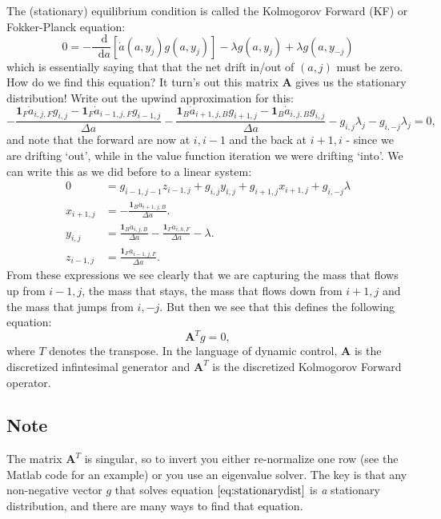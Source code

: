 \documentclass[12pt]{article}
\DeclareMathOperator{\1}{\mathbbm{1}}
\newcommand*\diff{\mathop{}\!\mathrm{d}}
\begin{document}
The (stationary) equilibrium condition is called the Kolmogorov Forward (KF) or Fokker-Planck equation:
\begin{equation}\label{eq:KF}
0 = - \frac{\diff}{\diff a} [\dot a(a,y_j)g(a,y_j)] - \lambda g(a,y_j) + \lambda g(a,y_{-j})
\end{equation}
which is essentially saying that that the net drift in/out of $(a,j)$ must be zero. How do we find this equation? It turn's out this matrix $\mathbf{A}$ gives us the stationary distribution! Write out the upwind approximation for this:
\begin{equation*}
-\frac{\mathbf{1}_F \dot a_{i,j,F} g_{i,j} - \mathbf{1}_F \dot a_{i-1,j,F} g_{i-1,j}}{\Delta a} - \frac{\mathbf{1}_B \dot a_{i+1,j,B} g_{i+1,j} - \mathbf{1}_B \dot a_{i,j,B} g_{i,j}}{\Delta a} - g_{i,j}\lambda_j - g_{i,-j}\lambda_j=0,
\end{equation*}
and note that the forward are now at $i,i-1$ and the back at $i+1,i$ - since we are drifting `out', while in the value function iteration we were drifting `into'. We can write this as we did before to a linear system:
\begin{align*}
0&=g_{i-1,j-1} z_{i-1,j} + g_{i,j} y_{i,j} + g_{i+1,j} x_{i+1,j} + g_{i,-j}\lambda \\
x_{i+1,j} &=  -\frac{\mathbf{1}_B \dot a_{i+1,j,B}}{\Delta a}. \\
y_{i,j} &=  \frac{\mathbf{1}_B \dot a_{i,j,B}}{\Delta a} -\frac{\mathbf{1}_F \dot a_{i,h,F}}{\Delta a} - \lambda. \\
z_{i-1,j} &= \frac{\mathbf{1}_F \dot a_{i-1,j,F}}{\Delta a}.
\end{align*}
From these expressions we see clearly that we are capturing the mass that flows up from $i-1,j$, the mass that stays, the mass that flows down from $i+1,j$ and the mass that jumps from $i,-j$. But then we see that this defines the following equation:
\begin{equation}\label{eq:stationarydist}
\mathbf{A}^{T}g = 0,
\end{equation}
where $T$ denotes the transpose. In the language of dynamic control, $\mathbf{A}$ is the discretized infintesimal generator and $\mathbf{A}^T$ is the discretized Kolmogorov Forward operator.

\subsection{Note}
The matrix $\mathbf{A}^T$ is singular, so to invert you either re-normalize one row (see the Matlab code for an example) or you use an eigenvalue solver. The key is that any non-negative vector $g$ that solves equation $\ref{eq:stationarydist}$   is \textit{a} stationary distribution, and there are many ways to find that equation.
\end{document}
